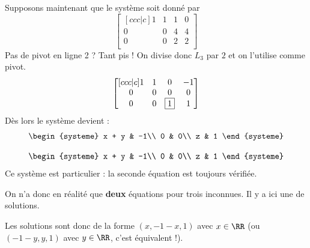 \begin{frame}
  Supposons maintenant que le système soit donné par
  \begin{equation*}
    \begin{bmatrix}[ccc|c]
      1 & 1 & 1 & 0\\
      0 & 0 & 4 & 4\\
      0 & 0 & 2 & 2\\
    \end{bmatrix}
  \end{equation*}\pause{}
  Pas de pivot en ligne 2 ? Tant pis ! On divise donc \(L_{3}\) par \(2\) et on l'utilise comme pivot.\pause{}
  \begin{equation*}
    \begin{bmatrix}[ccc|c]
      1 & 1 & 0 & -1\\
      0 & 0 & 0 & 0\\
      0 & 0 & \fbox{1} & 1\\
    \end{bmatrix}
  \end{equation*}
  Dès lors le système devient :
  \begin{equation*}
    \begin{systeme}
      x + y & -1\\
      0 & 0\\
      z & 1
    \end{systeme}
  \end{equation*}
\end{frame}
\begin{frame}
  \begin{equation*}
    \begin{systeme}
      x + y & -1\\
      0 & 0\\
      z & 1
    \end{systeme}
  \end{equation*}
  Ce système est particulier : la seconde équation est toujours vérifiée.\pause{}

  On n'a donc en réalité que \textbf{deux} équations pour trois inconnues. Il y a ici une  de solutions. \pause

  Les solutions sont donc de la forme \((x, -1 - x, 1)\) avec \(x \in \RR\) \pause(ou \((-1 - y,y,1)\) avec \(y \in \RR\), c'est équivalent !).
\end{frame}


